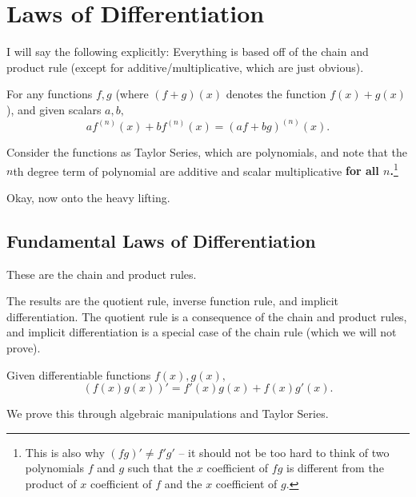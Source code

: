 \documentclass{article}
\begin{document}
\section{Laws of Differentiation}

I will say the following explicitly: Everything is based off of the chain and product rule (except for additive/multiplicative, which are just obvious).

\begin{theo}
For any functions $f,g$ (where $(f+g)(x)$ denotes the function $f(x)+g(x)$), and given scalars $a,b,$
\[af^{(n)}(x)+bf^{(n)}(x)=(af+bg)^{(n)}(x).\]
\end{theo}

\begin{pro}
Consider the functions as Taylor Series, which are polynomials, and note that the $n$th degree term of polynomial are additive and scalar multiplicative \textbf{for all $n$.}\footnote{This is also why $(fg)'\neq f'g'$ -- it should not be too hard to think of two polynomials $f$ and $g$ such that the $x$ coefficient of $fg$ is different from the product of $x$ coefficient of $f$ and the $x$ coefficient of $g.$}
\end{pro}

Okay, now onto the heavy lifting.

\subsection{Fundamental Laws of Differentiation}

These are the chain and product rules.

The results are the quotient rule, inverse function rule, and implicit differentiation. The quotient rule is a consequence of the chain and product rules, and implicit differentiation is a special case of the chain rule (which we will not prove).

\begin{theo}
Given differentiable functions $f(x),g(x),$
\[(f(x)g(x))'=f'(x)g(x)+f(x)g'(x).\]
\end{theo}

We prove this through algebraic manipulations and Taylor Series.
\end{document}
